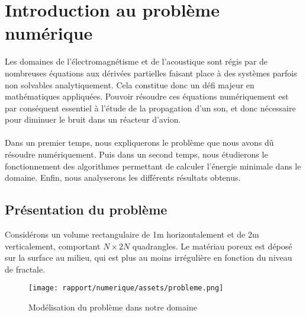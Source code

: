 \section{Introduction au problème numérique}

Les domaines de l'électromagnétisme et de l'acoustique sont régis par de nombreuses équations aux dérivées partielles faisant place à des systèmes parfois non solvables analytiquement. Cela constitue donc un défi majeur en mathématiques appliquées. Pouvoir résoudre ces équations numériquement est par conséquent essentiel à l'étude de la propagation d'un son, et donc nécessaire pour diminuer le bruit dans un réacteur d'avion.\\ \\
Dans un premier temps, nous expliquerons le problème que nous avons dû résoudre numériquement. Puis dans un second temps, nous étudierons le fonctionnement des algorithmes permettant de calculer l'énergie minimale dans le domaine. Enfin, nous analyserons les différents résultats obtenus.

\subsection{Présentation du problème}

Considérons un volume rectangulaire de 1m horizontalement et de 2m verticalement, comportant $N\times2N$ quadrangles. Le matériau poreux est déposé sur la surface au milieu, qui est plus au moins irrégulière en fonction du niveau de fractale.

\begin{figure}[H]
    \centering
    \texttt{[image: rapport/numerique/assets/probleme.png]}
    \caption{Modélisation du problème dans notre domaine}
    \label{fig:enter-label}
\end{figure}

